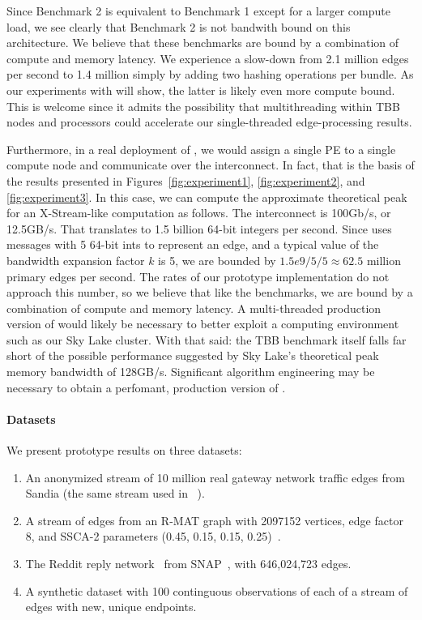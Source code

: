 Since Benchmark 2 is equivalent to Benchmark 1 except for a larger
compute load, we see clearly that Benchmark 2 is not bandwith bound 
on this 
architecture.  We believe that these benchmarks are bound by a combination
of compute and memory latency.  We experience a slow-down from 2.1 million 
edges per
second to 1.4 million simply by adding two hashing operations per bundle.
As our experiments with \XSCC will show, the latter is likely even more
compute bound.  This is welcome since it admits the possibility that
multithreading within TBB nodes and \XStream processors could accelerate our
single-threaded edge-processing results.

Furthermore, in a real deployment of \XSCCns, we would assign a single
\XStream PE to a single compute node and communicate over the interconnect.
In fact, that is the basis of the \XSCC results presented in 
Figures~\ref{fig:experiment1}, \ref{fig:experiment2}, and \ref{fig:experiment3}.
In this case, we can compute the approximate theoretical peak for an
X-Stream-like computation as follows.  The interconnect is 100Gb/s, or
12.5GB/s. That translates to 1.5 billion 64-bit integers per second.  Since
\XSCC uses messages with 5 64-bit ints to represent an edge, and a typical
value of the \XStream bandwidth expansion factor $k$ is 5, we are bounded
by $1.5e9 / 5 / 5 \approx 62.5$ million \XSCC primary edges per second.
The rates of our prototype implementation do not approach this number, so
we believe that like the benchmarks, we are bound by a combination of
compute and memory latency.  A multi-threaded production version of
\XSCC would likely be necessary to better exploit a computing environment such
as our Sky Lake cluster.  With
that said: the TBB benchmark itself falls far short of the possible 
performance suggested by Sky Lake's theoretical peak memory bandwidth of 
128GB/s.
Significant algorithm engineering may be necessary to obtain a perfomant,
production version of \XSCCns.

\paragraph{Datasets}

We present prototype \XSCC results on three datasets:
\begin{enumerate}
    \item An anonymized stream of 10 million real gateway network traffic edges 
    from Sandia (the same stream used in ~\cite{AMP:berry2013maintaining}).
    \item A stream of edges from an R-MAT graph with 2097152 vertices,
    edge factor 8, and SSCA-2 parameters (0.45, 0.15, 0.15, 0.25)~\cite{rmat}.
    \item The Reddit reply network~\cite{kumar2018community} from SNAP~\cite{snapnets}, with 646,024,723 edges.
    \item A synthetic dataset with 100 continguous observations of
    each of a stream of edges with new, unique endpoints.
\end{enumerate}

